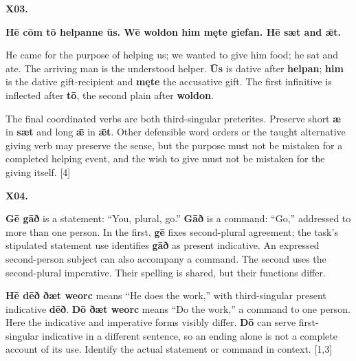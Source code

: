 \par\begin{minipage}{\linewidth}\raggedright
\textbf{X03.}

\textbf{Hē cōm tō helpanne ūs. Wē woldon him męte giefan. Hē sæt and ǣt.}

He came for the purpose of helping us; we wanted to give him food; he sat and ate. The arriving man is the understood helper. \textbf{Ūs} is dative after \textbf{helpan}; \textbf{him} is the dative gift-recipient and \textbf{męte} the accusative gift. The first infinitive is inflected after \textbf{tō}, the second plain after \textbf{woldon}.

The final coordinated verbs are both third-singular preterites. Preserve short \textbf{æ} in \textbf{sæt} and long \textbf{ǣ} in \textbf{ǣt}. Other defensible word orders or the taught alternative giving verb may preserve the sense, but the purpose must not be mistaken for a completed helping event, and the wish to give must not be mistaken for the giving itself. [4]

\end{minipage}\par\addvspace{4pt}

\par\begin{minipage}{\linewidth}\raggedright
\textbf{X04.}

\textbf{Gē gāð} is a statement: “You, plural, go.” \textbf{Gāð} is a command: “Go,” addressed to more than one person. In the first, \textbf{gē} fixes second-plural agreement; the task’s stipulated statement use identifies \textbf{gāð} as present indicative. An expressed second-person subject can also accompany a command. The second uses the second-plural imperative. Their spelling is shared, but their functions differ.

\textbf{Hē dēð ðæt weorc} means “He does the work,” with third-singular present indicative \textbf{dēð}. \textbf{Dō ðæt weorc} means “Do the work,” a command to one person. Here the indicative and imperative forms visibly differ. \textbf{Dō} can serve first-singular indicative in a different sentence, so an ending alone is not a complete account of its use. Identify the actual statement or command in context. [1,3]

\end{minipage}\par\addvspace{4pt}


